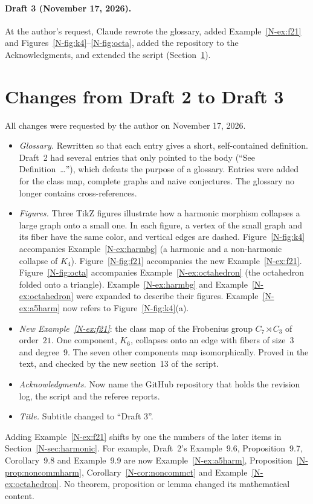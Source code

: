 \documentclass[12pt,letterpaper]{article}
\begin{document}
\paragraph{Draft 3 (November 17, 2026).} At the author's request, Claude
rewrote the glossary, added Example~\ref{N-ex:f21} and
Figures~\ref{N-fig:k4}--\ref{N-fig:octa}, added the repository to the
Acknowledgments, and extended the script (Section~\ref{sec:d2d3}).

\section{Changes from Draft 2 to Draft 3}\label{sec:d2d3}

All changes were requested by the author on November 17, 2026.
\begin{itemize}[itemsep=1pt]
\item \emph{Glossary.} Rewritten so that each entry gives a short,
  self-contained definition. Draft~2 had several entries that only pointed
  to the body (``See Definition~\dots''), which defeats the purpose of a
  glossary. Entries were added for the class map, complete graphs and naive
  conjectures. The glossary no longer contains cross-references.
\item \emph{Figures.} Three TikZ figures illustrate how a harmonic morphism
  collapses a large graph onto a small one. In each figure, a vertex of the
  small graph and its fiber have the same color, and vertical edges are
  dashed.
  Figure~\ref{N-fig:k4} accompanies Example~\ref{N-ex:harmbg} (a harmonic
  and a non-harmonic collapse of $K_4$). Figure~\ref{N-fig:f21} accompanies
  the new Example~\ref{N-ex:f21}. Figure~\ref{N-fig:octa} accompanies
  Example~\ref{N-ex:octahedron} (the octahedron folded onto a triangle).
  Example~\ref{N-ex:harmbg} and Example~\ref{N-ex:octahedron} were expanded
  to describe their figures.
  Example~\ref{N-ex:a5harm} now refers to Figure~\ref{N-fig:k4}(a).
\item \emph{New Example~\ref{N-ex:f21}}: the class map of the Frobenius
  group $C_7\rtimes C_3$ of order~$21$. One component, $K_6$, collapses onto
  an edge with fibers of size~$3$ and degree~$9$. The seven other
  components map isomorphically. Proved in the text, and checked by the new
  section~13 of the script.
\item \emph{Acknowledgments.} Now name the GitHub repository that holds the
  revision log, the script and the referee reports.
\item \emph{Title.} Subtitle changed to ``Draft 3''.
\end{itemize}
Adding Example~\ref{N-ex:f21} shifts by one the numbers of the later items
in Section~\ref{N-sec:harmonic}. For example, Draft~2's
Example~9.6, Proposition~9.7, Corollary~9.8 and Example~9.9 are now
Example~\ref{N-ex:a5harm}, Proposition~\ref{N-prop:noncommharm},
Corollary~\ref{N-cor:noncommct} and Example~\ref{N-ex:octahedron}. No
theorem, proposition or lemma changed its mathematical content.
\end{document}
